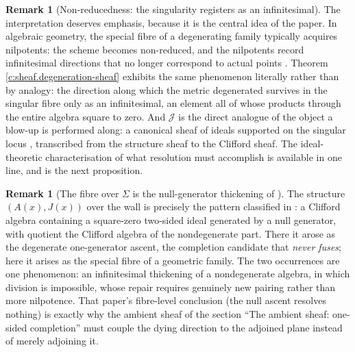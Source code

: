 \documentclass[11pt]{article}
\theoremstyle{definition}
\newtheorem{remark}[theorem]{Remark}
\theoremstyle{plain}
\providecommand{\Sig}{}\renewcommand{\Sig}{\Sigma}
\providecommand{\shJ}{}\renewcommand{\shJ}{\mathcal{J}}
\begin{document}
\begin{remark}[Non-reducedness: the singularity registers as an infinitesimal]\label{c:note.sheaf.non-reducedness-singularity-registers-infinitesimal}
The interpretation deserves emphasis, because it is the central idea of the paper. In algebraic geometry, the special fibre of a degenerating family typically acquires nilpotents: the scheme becomes non-reduced, and the nilpotents record infinitesimal directions that no longer correspond to actual points \cite[Ch.~II]{Hartshorne1977}. Theorem \ref{c:sheaf.degeneration-sheaf} exhibits the same phenomenon literally rather than by analogy: the direction along which the metric degenerated survives in the singular fibre only as an infinitesimal, an element all of whose products through the entire algebra square to zero. And $\shJ$ is the direct analogue of the object a blow-up is performed along: a canonical sheaf of ideals supported on the singular locus \cite[\S II.7]{Hartshorne1977}, transcribed from the structure sheaf to the Clifford sheaf. The ideal-theoretic characterisation of what resolution must accomplish is available in one line, and is the next proposition.
\end{remark}

\begin{remark}[The fibre over $\Sig$ is the null-generator thickening of \cite{ButlerT1}]\label{c:note.sheaf.fibre-over-null-generator-thickening-butlert1}
The structure $(A(x), J(x))$ over the wall is precisely the pattern classified in \cite[Thm.~5.7(2)]{ButlerT1}: a Clifford algebra containing a square-zero two-sided ideal generated by a null generator, with quotient the Clifford algebra of the nondegenerate part. There it arose as the degenerate one-generator ascent, the completion candidate that \emph{never fuses}; here it arises as the special fibre of a geometric family. The two occurrences are one phenomenon: an infinitesimal thickening of a nondegenerate algebra, in which division is impossible, whose repair requires genuinely new pairing rather than more nilpotence. That paper's fibre-level conclusion (the null ascent resolves nothing) is exactly why the ambient sheaf of the section ``The ambient sheaf: one-sided completion'' must couple the dying direction to the adjoined plane instead of merely adjoining it.
\end{remark}
\end{document}
